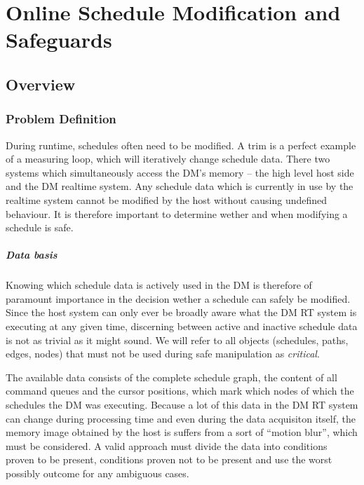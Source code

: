 \chapter{Online Schedule Modification and Safeguards}
\label{chap:online-sched-mod}
\section{Overview}

\subsection{Problem Definition}

During runtime, schedules often need to be modified. A trim is a perfect example of a measuring loop, which will iteratively change schedule data.
There two systems which simultaneously access the DM's memory -- the high level host side and the DM realtime system.
Any schedule data which is currently in use by the realtime system cannot be modified by the host without causing undefined behaviour.
It is therefore important to determine wether and when modifying a schedule is safe.
\paragraph{Data basis}
Knowing which schedule data is actively used in the DM is therefore of paramount importance in the decision wether a schedule can safely be modified.
Since the host system can only ever be broadly aware what the DM RT system is executing at any given time, discerning between active and inactive schedule data is not as trivial as it might sound.
We will refer to all objects (schedules, paths, edges, nodes) that must not be used during safe manipulation as \emph{critical}.
\par
The available data consists of the complete schedule graph, the content of all command queues and the cursor positions, which mark which nodes of which the schedules the DM was executing.
Because a lot of this data in the DM RT system can change during processing time and even during the data acquisiton itself, the memory image obtained by the host is suffers from a sort of \enquote{motion blur}, which must be considered. A valid approach must divide the data into conditions proven to be present, conditions proven not to be present and use the worst possibly outcome for any ambiguous cases.
